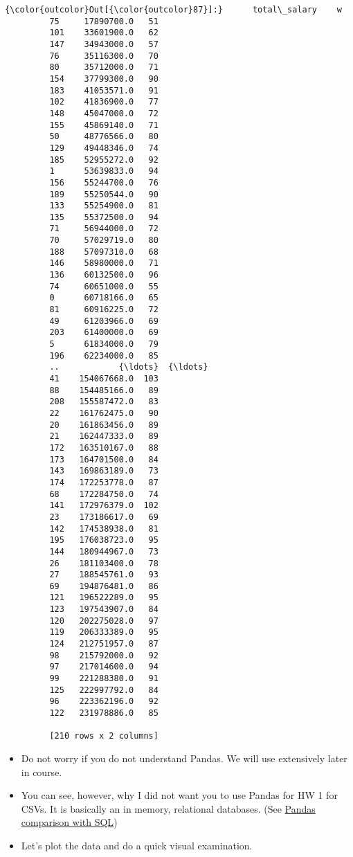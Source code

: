 \documentclass[11pt]{article}
\begin{document}
\begin{Verbatim}[commandchars=\\\{\}]
{\color{outcolor}Out[{\color{outcolor}87}]:}      total\_salary    w
         75     17890700.0   51
         101    33601900.0   62
         147    34943000.0   57
         76     35116300.0   70
         80     35712000.0   71
         154    37799300.0   90
         183    41053571.0   91
         102    41836900.0   77
         148    45047000.0   72
         155    45869140.0   71
         50     48776566.0   80
         129    49448346.0   74
         185    52955272.0   92
         1      53639833.0   94
         156    55244700.0   76
         189    55250544.0   90
         133    55254900.0   81
         135    55372500.0   94
         71     56944000.0   72
         70     57029719.0   80
         188    57097310.0   68
         146    58980000.0   71
         136    60132500.0   96
         74     60651000.0   55
         0      60718166.0   65
         81     60916225.0   72
         49     61203966.0   69
         203    61400000.0   69
         5      61834000.0   79
         196    62234000.0   85
         ..            {\ldots}  {\ldots}
         41    154067668.0  103
         88    154485166.0   89
         208   155587472.0   83
         22    161762475.0   90
         20    161863456.0   89
         21    162447333.0   89
         172   163510167.0   88
         173   164701500.0   84
         143   169863189.0   73
         174   172253778.0   87
         68    172284750.0   74
         141   172976379.0  102
         23    173186617.0   69
         142   174538938.0   81
         195   176038723.0   95
         144   180944967.0   73
         26    181103400.0   78
         27    188545761.0   93
         69    194876481.0   86
         121   196522289.0   95
         123   197543907.0   84
         120   202275028.0   97
         119   206333389.0   95
         124   212751957.0   87
         98    215792000.0   92
         97    217014600.0   94
         99    221288380.0   91
         125   222997792.0   84
         96    223362196.0   92
         122   231978886.0   85
         
         [210 rows x 2 columns]
\end{Verbatim}
            
    \begin{itemize}
\item
  Do not worry if you do not understand Pandas. We will use extensively
  later in course.
\item
  You can see, however, why I did not want you to use Pandas for HW 1
  for CSVs. It is basically an in memory, relational databases. (See
  \href{https://pandas.pydata.org/pandas-docs/stable/comparison_with_sql.html}{Pandas
  comparison with SQL})
\item
  Let's plot the data and do a quick visual examination.
\end{itemize}
\end{document}
